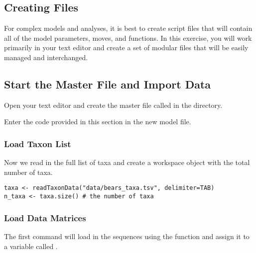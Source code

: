 \bigskip

\subsection{Creating \Rev Files}\label{subsect:RB-CreateingFiles}

For complex models and analyses, it is best to create \Rev script files that will contain all of the model parameters, moves, and functions. 
In this exercise, you will work primarily in your text editor and create a set of modular files that will be easily managed and interchanged.

\bigskip
\subsection{Start the Master \Rev File and Import Data}\label{subsect:RB-StartMasterRev}



{\begin{framed}
Open your text editor and create the master \Rev file called {\textcolor{red}{}} in the  directory.

Enter the \Rev code provided in this section in the new model file.
\end{framed}}

\medskip
\subsubsection{Load Taxon List}\label{subsub:RB-TaxList}

Now we read in the full list of taxa and create a workspace object with the total number of taxa. 

{\tt \begin{snugshade*}
\begin{lstlisting}
taxa <- readTaxonData("data/bears_taxa.tsv", delimiter=TAB)
n_taxa <- taxa.size() # the number of taxa
\end{lstlisting}
\end{snugshade*}}

\medskip
\subsubsection{Load Data Matrices}\label{subsub:RB-LoadData}

The first command will load in the sequences using the  function and assign it to a variable called . 

